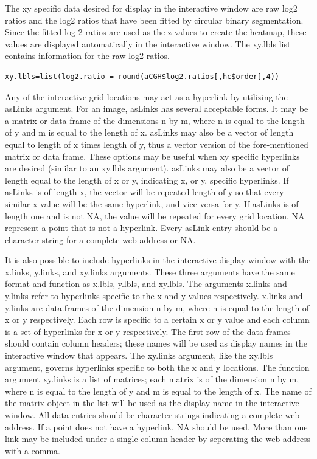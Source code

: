 \documentclass[]{article}
\begin{document}
\indent The xy specific data desired for display in the interactive window are raw log2 ratios and the log2 ratios that have been fitted by circular binary segmentation. Since the fitted log 2 ratios are used as the z values to create the heatmap, these values are displayed automatically in the interactive window. The xy.lbls list contains information for the raw log2 ratios. 

\begin{verbatim}
xy.lbls=list(log2.ratio = round(aCGH$log2.ratios[,hc$order],4))
\end{verbatim}



\indent Any of the interactive grid locations may act as a hyperlink by utilizing the asLinks argument. For an image, asLinks has several acceptable forms. It may be a matrix or data frame of the dimensions n by m, where n is equal to the length of y and m is equal to the length of x. asLinks may also be a vector of length equal to length of x times length of y, thus a vector version of the fore-mentioned matrix or data frame. These options may be useful when xy specific hyperlinks are desired (similar to an xy.lbls argument). asLinks may also be a vector of length equal to the length of x or y, indicating x, or y, specific hyperlinks. If asLinks is of length x, the vector will be repeated length of y so that every similar x value will be the same hyperlink, and vice versa for y. If asLinks is of length one and is not NA, the value will be repeated for every grid location. NA represent a point that is not a hyperlink.  Every asLink entry should be a character string for a complete web address or NA. \newline

\indent It is also possible to include hyperlinks in the interactive display window with the x.links, y.links, and xy.links arguments. These three arguments have the same format and function as x.lbls, y.lbls, and xy.lbls. The arguments x.links and y.links refer to hyperlinks specific to the x and y values respectively. x.links and y.links are data.frames of the dimension n by m, where n is equal to the length of x or y respectively. Each row is specific to a certain x or y value and each column is a set of hyperlinks for x or y respectively. The first row of the data frames should contain column headers; these names will be used as display names in the interactive window that appears. The xy.links argument, like the  xy.lbls argument, governs hyperlinks specific to both the x and y locations. The function argument xy.links is a list of matrices; each matrix is of the dimension n by m, where n is equal to the length of y and m is equal to the length of x. The name of the matrix object in the list will be used as the display name in the interactive window. All data entries should be character strings indicating a complete web address. If a point does not have a hyperlink, NA should be used. More than one link may be included under a single column header by seperating the web address with a comma. \newline 
\end{document}
